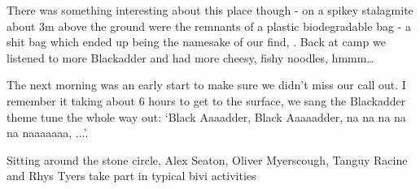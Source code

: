 There was something interesting about this place though - on a spikey stalagmite about 3m above the ground were the remnants of a plastic biodegradable bag - a shit bag which ended up being the namesake of our find, . Back at camp we listened to more Blackadder and had more cheesy, fishy noodles, hmmm…

The next morning was an early start to make sure we didn’t miss our call out. I remember it taking about 6 hours to get to the surface, we sang the Blackadder theme tune the whole way out: `Black Aaaadder, Black Aaaaadder, na na na na na naaaaaaa, ...'.


\begin{pagefigure}
\centering
{}
\caption{Sitting around the stone circle, Alex Seaton, Oliver Myerscough, Tanguy Racine and Rhys Tyers take part in typical bivi activities } \label{people in the bivi}
\end{pagefigure}

